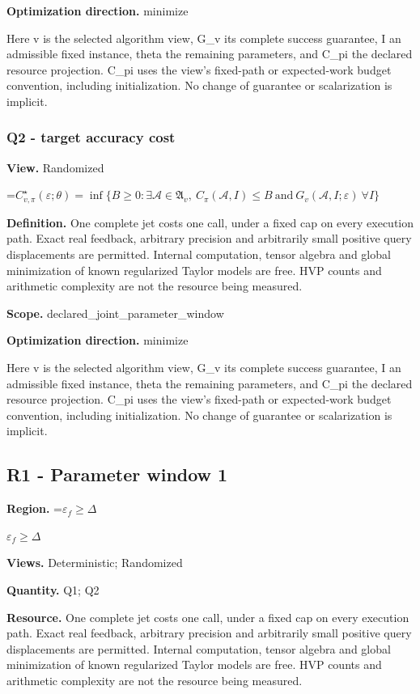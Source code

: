 \documentclass[10pt,a4paper]{article}
\newcommand{\AtlasMath}[1]{\par\begingroup\centering\setbox0=\hbox{$\displaystyle #1$}\ifdim\wd0>1.4\linewidth\typeout{ATLAS WIDE FORMULA: \the\wd0}\fi\ifdim\wd0>\linewidth\resizebox{\linewidth}{!}{\box0}\else\box0\fi\par\endgroup}
\newcommand{\AtlasInlineMath}[1]{\begingroup\setbox0=\hbox{$#1$}\ifdim\wd0>.4\linewidth\endgroup\AtlasMath{#1}\else\endgroup$#1$\fi}
\begin{document}
\textbf{Optimization direction.} minimize

Here v is the selected algorithm view, G\_v its complete success guarantee, I an admissible fixed instance, theta the remaining parameters, and C\_pi the declared resource projection. C\_pi uses the view's fixed-path or expected-work budget convention, including initialization. No change of guarantee or scalarization is implicit.

\subsubsection{Q2 - target accuracy cost}
\textbf{View.} Randomized

\AtlasMath{C^\star_{v,\pi}(\varepsilon;\theta)=\inf\{B\ge0:\exists\mathcal A\in\mathfrak A_v,\ C_\pi(\mathcal A,I)\le B\ \text{and}\ G_v(\mathcal A,I;\varepsilon)\ \forall I\}}
\textbf{Definition.} One complete jet costs one call, under a fixed cap on every execution path. Exact real feedback, arbitrary precision and arbitrarily small positive query displacements are permitted. Internal computation, tensor algebra and global minimization of known regularized Taylor models are free. HVP counts and arithmetic complexity are not the resource being measured.

\textbf{Scope.} declared\_joint\_parameter\_window

\textbf{Optimization direction.} minimize

Here v is the selected algorithm view, G\_v its complete success guarantee, I an admissible fixed instance, theta the remaining parameters, and C\_pi the declared resource projection. C\_pi uses the view's fixed-path or expected-work budget convention, including initialization. No change of guarantee or scalarization is implicit.

\subsection{R1 - Parameter window 1}
\textbf{Region.} \AtlasInlineMath{\varepsilon_f\ge \Delta}

\textbf{Views.} Deterministic; Randomized

\textbf{Quantity.} Q1; Q2

\textbf{Resource.} One complete jet costs one call, under a fixed cap on every execution path. Exact real feedback, arbitrary precision and arbitrarily small positive query displacements are permitted. Internal computation, tensor algebra and global minimization of known regularized Taylor models are free. HVP counts and arithmetic complexity are not the resource being measured.
\end{document}

